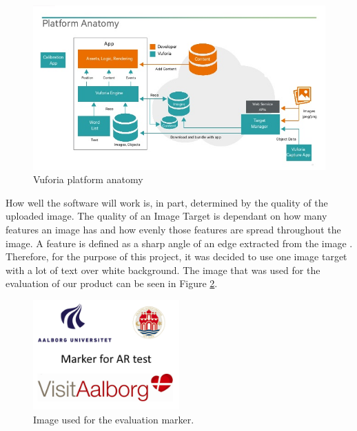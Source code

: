 \begin{figure}[h!]
    \centering
    \includegraphics[width=\textwidth]{figures/imp1.jpg}
    \caption{Vuforia platform anatomy \cite{getting_started}}\label{fig:imp1}
\end{figure}

How well the software will  work is, in part, determined by the quality of the uploaded image. The quality of an Image Target is dependant on how many features an image has and how evenly those features are spread throughout the image. A feature is defined as a sharp angle of an edge extracted from the image \cite{Natural_features}. Therefore, for the purpose of this project, it was decided to use one image target with a lot of text over white background. The image that was used for the evaluation of our product can be seen in Figure \ref{fig:imp2}. 

\begin{figure}[h!]
    \centering
    \includegraphics[width=0.5\textwidth]{figures/imp2.png}
    \caption{Image used for the evaluation marker.}\label{fig:imp2}
\end{figure}

